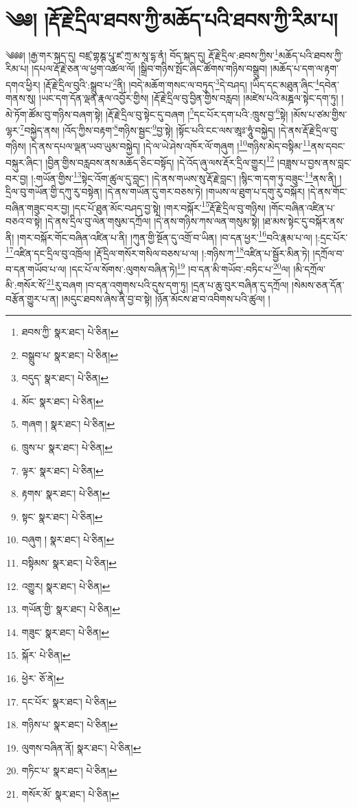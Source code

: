 \setcounter{footnote}{0} 
\chapter{༄༅། །རྡོ་རྗེ་དྲིལ་ཐབས་ཀྱི་མཆོད་པའི་ཐབས་ཀྱི་རིམ་པ།}༄༅༅། །རྒྱ་གར་སྐད་དུ། བཛྲ་གྷཎྚ་པཱུ་ཛ་ཀྲ་མ་སཱ་དྷ་ནཾ། བོད་སྐད་དུ། རྡོ་རྗེ་དྲིལ་:ཐབས་ཀྱིས་\footnote{ཐབས་ཀྱི་  སྣར་ཐང་།  པེ་ཅིན། }མཆོད་པའི་ཐབས་ཀྱི་རིམ་པ། །དཔལ་རྡོ་རྗེ་ཅན་ལ་ཕྱག་འཚལ་ལོ། །སྒྲིབ་གཉིས་སྤོང་ཞིང་ཚོགས་གཉིས་བསྒྲུབ། །མཆོད་པ་དག་ལ་རྟག་དགའ་ཕྱིར། །རྡོ་རྗེ་དྲིལ་བུའི་:སྒྲུབ་པ་\footnote{བསྒྲུབ་པ་  སྣར་ཐང་།  པེ་ཅིན། }ནི། །བདེ་མཆོག་གསང་ལ་བཏུད་\footnote{བདུད་  སྣར་ཐང་།  པེ་ཅིན། }དེ་བཤད། །ཡིད་དང་མཐུན་ཞིང་\footnote{མོང་  སྣར་ཐང་།  པེ་ཅིན། }དབེན་གནས་སུ། །ཡང་དག་དོན་ལྡན་རྣལ་འབྱོར་གྱིས། །རྡོ་རྗེ་དྲིལ་བུ་བྱིན་གྱིས་བརླབ། །མཛེས་པའི་མཎྜལ་སྟེང་དག་ཏུ། །མེ་ཏོག་ཚོམ་བུ་གཉིས་བཞག་སྟེ། །རྡོ་རྗེ་དྲིལ་བུ་སྟེང་དུ་བཞག །\footnote{གཞག །  སྣར་ཐང་།  པེ་ཅིན། }དང་པོར་དག་པའི་:ཁྲུས་བྱ་\footnote{ཁྲུས་པ་  སྣར་ཐང་།  པེ་ཅིན། }སྟེ། །མོས་པ་ཙམ་གྱིས་ལྷར་\footnote{ལྟར་  སྣར་ཐང་།  པེ་ཅིན། }བསྐྱེད་ནས། །འོད་ཀྱིས་བརྟག་\footnote{རྟགས་  སྣར་ཐང་།  པེ་ཅིན། }གཉིས་སྦྱང་\footnote{སྟང་  སྣར་ཐང་།  པེ་ཅིན། }བྱ་སྟེ། །སྟོང་པའི་ངང་ལས་ཨཱཿ་ཧཱུཾ་བསྐྱེད། །དེ་ནས་རྡོ་རྗེ་དྲིལ་བུ་གཉིས། །དེ་ནས་དཔལ་ལྡན་ཡབ་ཡུམ་བསྐྱེད། །དེ་ལ་ཡེ་ཤེས་འཁོར་ལོ་གཞུག །\footnote{བཞུག །  སྣར་ཐང་།  པེ་ཅིན། }གཉིས་མེད་བསྟིམ་\footnote{བསྟིམས་  སྣར་ཐང་།  པེ་ཅིན། }ནས་དབང་བསྐུར་ཞིང་། །བྱིན་གྱིས་བརླབས་ནས་མཆོད་ཅིང་བསྟོད། །དེ་འོད་ཞུ་ལས་རྡོར་དྲིལ་གྱུར།\footnote{འགྱུར།  སྣར་ཐང་།  པེ་ཅིན། } །བཟླས་པ་བྱས་ནས་བླང་བར་བྱ། །:གཡོན་གྱིས་\footnote{གཡོན་གྱི་  སྣར་ཐང་།  པེ་ཅིན། }སྟེང་འོག་ཚུལ་དུ་བླང་། །དེ་ནས་གཡས་སུ་རྡོ་རྗེ་བླང་། །སྙིང་ག་དག་ཏུ་བཟུང་\footnote{གཟུང་  སྣར་ཐང་།  པེ་ཅིན། }ནས་ནི། །དྲིལ་བུ་གཡོན་གྱི་དཀུ་རུ་བསྟེན། །དེ་ནས་གཡོན་དུ་གར་བཅས་ཏེ། །གཡས་ལ་ཐུག་པ་དགུ་རུ་བསྐོར། །དེ་ནས་གོང་བཞིན་གཟུང་བར་བྱ། །དང་པོ་ཐུན་མོང་བཤད་བྱ་སྟེ། །གར་བསྐོར་\footnote{སྐོར་  པེ་ཅིན། }རྡོ་རྗེ་དྲིལ་བུ་གཉིས། །གོང་བཞིན་འཛིན་པ་བཅའ་བ་སྟེ། །དེ་ནས་དྲིལ་བུ་ལེན་གསུམ་དཀྲོལ། །དེ་ནས་གཉིས་ཀས་ལན་གསུམ་སྟེ། །ཐ་མས་སྟེང་དུ་བསྐོར་ནས་ནི། །གར་བསྐོར་གོང་བཞིན་འཛིན་པ་ནི། །ཀུན་གྱི་སྔོན་དུ་འགྲོ་བ་ཡིན། །བ་དན་ཕྱར་\footnote{ཕྱེར་  ཅོ་ནེ། }བའི་རྣམ་པ་ལ། །:དྲང་པོར་\footnote{དང་པོར་  སྣར་ཐང་།  པེ་ཅིན། }འཛིན་དང་དྲིལ་བུ་འཁྲོལ། །རྡོ་དྲིལ་གསོར་གསིལ་བཅས་པ་ལ། །:གཉིས་ཀ་\footnote{གཉིས་པ་  སྣར་ཐང་།  པེ་ཅིན། }འཛིན་པ་སྦྱོར་མིན་ཏེ། །དཀྲོལ་བ་བ་དན་གཡོབ་པ་ལ། །དང་པོ་ལ་སོགས་:ལུགས་བཞིན་ཏེ།\footnote{ལུགས་བཞིན་ནོ།  སྣར་ཐང་།  པེ་ཅིན། } །བ་དན་མི་གཡོབ་:བཏིང་པ་\footnote{གཏིང་པ་  སྣར་ཐང་།  པེ་ཅིན། }ལ། །མི་དཀྲོལ་མི་:གསོར་སོ་\footnote{གསོར་མོ་  སྣར་ཐང་།  པེ་ཅིན། }རུ་བཞག །བ་དན་འགུགས་པའི་དུས་དག་ཏུ། །དྲན་པ་ཆུ་བུར་བཞིན་དུ་དཀྲོལ། །སེམས་ཅན་དོན་བརྩོན་གྱུར་པ་ན། །མདུང་ཐབས་ཞེས་ནི་བྱ་བ་སྟེ། །ཉོན་མོངས་ཐ་བ་འབིགས་པའི་ཚུལ། །

